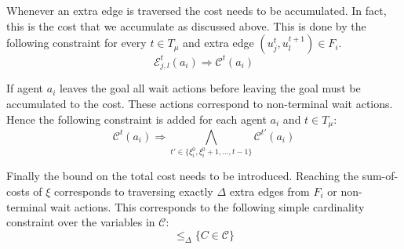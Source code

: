 \documentclass[jair,oneside,11pt]{article}
\begin{document}
 Whenever an extra edge is traversed the cost needs to be accumulated. In fact, this is the cost that we accumulate as discussed above. This is done by the following constraint for every $t \in T_\mu$ and extra edge $(u^t_j,u^{t+1}_l) \in F_i$.
\begin{equation}
   { \mathcal{E}^t_{j,l}(a_i) \Rightarrow \mathcal{C}^t(a_i)
    }\label{eq:basic-8}
\end{equation}
\vspace{0.25cm}



 If agent $a_i$ leaves the goal all wait actions before leaving the goal must be accumulated to the cost. These actions correspond to non-terminal wait actions. Hence the following constraint is added for each agent $a_i$ and  $t \in T_\mu$:
\begin{equation}
   { \mathcal{C}^t(a_i) \Rightarrow \bigwedge_{t' \in \{\xi_i^0,\xi_i^0+1,...,t-1\}}{\mathcal{C}^{t'}(a_i)}
    }\label{eq:basic-9}
\end{equation}
\vspace{0.25cm}


 Finally the bound on the total cost needs to be introduced. Reaching the sum-of-costs of $\xi$ corresponds to traversing exactly $\Delta$ extra edges from $F_i$ or non-terminal wait actions. This corresponds to the following simple cardinality constraint over the variables in $\mathcal{C}$:
\begin{equation}
  \leq_{\Delta} \{ C\in \mathcal{C} \} 
        \label{eq:basic-end}
\end{equation}
\vspace{0.25cm}
\end{document}

